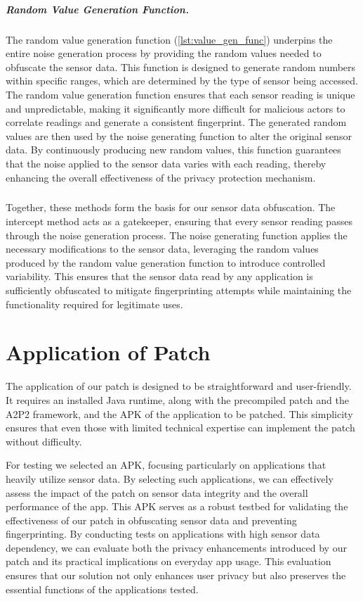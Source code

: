 \documentclass[11pt,
  oneside,openany,    %
]{scrreprt}
\begin{document}
\paragraph{Random Value Generation Function.}
\label{par:random_vale_gen_func}
The random value generation function (\ref{lst:value_gen_func}) underpins the entire noise generation process by providing the random values needed to obfuscate the sensor data.
This function is designed to generate random numbers within specific ranges, which are determined by the type of sensor being accessed.
The random value generation function ensures that each sensor reading is unique and unpredictable, making it significantly more difficult for malicious actors to correlate readings and generate a consistent fingerprint.
The generated random values are then used by the noise generating function to alter the original sensor data.
By continuously producing new random values, this function guarantees that the noise applied to the sensor data varies with each reading, thereby enhancing the overall effectiveness of the privacy protection mechanism.

\paragraph{}
Together, these methods form the basis for our sensor data obfuscation. 
The intercept method acts as a gatekeeper, ensuring that every sensor reading passes through the noise generation process.
The noise generating function applies the necessary modifications to the sensor data, leveraging the random values produced by the random value generation function to introduce controlled variability.
This ensures that the sensor data read by any application is sufficiently obfuscated to mitigate fingerprinting attempts while maintaining the functionality required for legitimate uses.

\chapter{Application of Patch}
\label{chap:applying}
The application of our patch is designed to be straightforward and user-friendly.
It requires an installed Java runtime, along with the precompiled patch and the A2P2 framework, and the APK of the application to be patched.
This simplicity ensures that even those with limited technical expertise can implement the patch without difficulty.

For testing we selected an APK, focusing particularly on applications that heavily utilize sensor data.
By selecting such applications, we can effectively assess the impact of the patch on sensor data integrity and the overall performance of the app.
This APK serves as a robust testbed for validating the effectiveness of our patch in obfuscating sensor data and preventing fingerprinting.
By conducting tests on applications with high sensor data dependency, we can evaluate both the privacy enhancements introduced by our patch and its practical implications on everyday app usage.
This evaluation ensures that our solution not only enhances user privacy but also preserves the essential functions of the applications tested.
\end{document}
